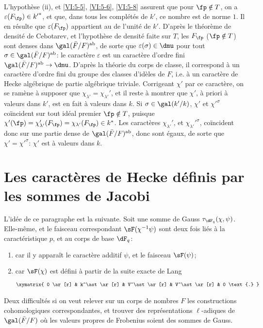 L'hypothèse (ii), et \ref{VI:5-5}, \ref{VI:5-6}, \ref{VI:5-8} assurent que 
pour $\fp\notin T$, on a $\varepsilon(F_\fp)\in {k'}^\ast$, et que, dans tous 
les complétés de $k'$, ce nombre est de norme $1$. Il en résulte que 
$\varepsilon(F_\fp)$ appartient au  de l'unité 
de $k'$. D'après le théorème de densité de Cebotarev, et l'hypothèse 
de densité faite sur $T$, les $F_\fp$ ($\fp\notin T$) sont denses dans 
$\gal(\bar F/F)^\text{ab}$, de sorte que $\varepsilon(\sigma)\in \dmu$ pour tout 
$\sigma\in \gal(\bar F/F)^\text{ab}$: le caractère $\varepsilon$ est un 
caractère d'ordre fini $\gal(\bar F/F)^\text{ab}\to \dmu$. D'après la 
théorie du corps de classe, il correspond à un caractère d'ordre fini 
du groupe des classes d'idèles de $F$, i.e. à un caractère de Hecke 
algébrique de partie algébrique triviale. Corrigeant $\chi'$ par ce 
caractère, on se ramène à supposer que 
$\chi_{\lambda'}=\chi_{\lambda'}'$,  et il reste à montrer que $\chi'$, à 
priori à valeurs dans $k'$, est en fait à valeurs dans $k$. Si 
$\sigma\in \gal(k'/k)$, $\chi'$ et ${\chi'}^\sigma$ coïncident sur tout idéal 
premier $\fp\notin T$, puisque 
$\chi'(\fp) = \chi'_{\lambda'}(F_\fp) = \chi_{\lambda'}(F_\fp) \in k^\ast$. 
Les caractères $\chi_{\lambda'}'$, et ${\chi_{\lambda'}'}^\sigma$, coïncident 
donc sur une partie dense de $\gal(\bar F/F)^\text{ab}$, donc sont égaux, de 
sorte que $\chi'={\chi'}^\sigma$: $\chi'$ est à valeurs dans $k$. 










\section{Les caractères de Hecke définis par les sommes de Jacobi}\label{VI:6}

L'idée de ce paragraphe est la suivante. Soit une somme de Gauss 
$\tau_{\dF_q}(\chi,\psi)$. Elle-même, et le faisceau correspondant 
$\sF(\chi^{-1}\psi)$ sont deux fois liés à la caractéristique $p$, et au 
corps de base $\dF_q$: 
\begin{enumerate}[\indent a)]
  \item car il y appara\^it le caractère additif $\psi$, et le faisceau 
    $\sF(\psi)$; 
  \item car $\sF(\chi)$ est défini à partir de la suite exacte de Lang 
    \[\xymatrix{
      0 \ar[r] 
        & k^\ast \ar[r] 
        & V^\ast \ar[r] 
        & V^\ast \ar[r] 
        & 0 \text{.} 
    }\]
\end{enumerate}
Deux difficultés si on veut relever sur un corps de nombres $F$ les 
constructions cohomologiques correspondantes, et trouver des 
représentations $\ell$-adiques de $\gal(\bar F/F)$ où les valeurs propres 
de Frobenius soient des sommes de Gauss. 

